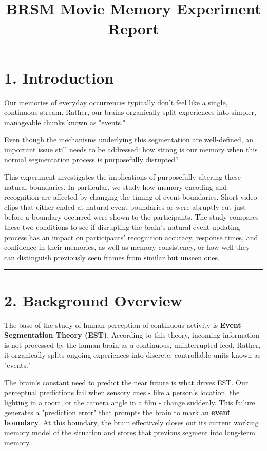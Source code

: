 \documentclass[10pt,a4paper]{article}
\title{\vspace{-2.5em}BRSM Movie Memory Experiment Report\vspace{-1em}}
\author{}
\date{}
\begin{document}
\maketitle
\vspace{-3em}

\section{1. Introduction}
Our memories of everyday occurrences typically don't feel like a single, continuous stream. Rather, our brains organically split experiences into simpler, manageable chunks known as "events."
 
Even though the mechanisms underlying this segmentation are well-defined, an important issue still needs to be addressed: how strong is our memory when this normal segmentation process is purposefully disrupted?

This experiment investigates the implications of purposefully altering these natural boundaries. In particular, we study how memory encoding and recognition are affected by changing the timing of event boundaries. Short video clips that either ended at natural event boundaries or were abruptly cut just before a boundary occurred were shown to the participants. The study compares these two conditions to see if disrupting the brain's natural event-updating process has an impact on participants' recognition accuracy, response times, and confidence in their memories, as well as memory consistency, or how well they can distinguish previously seen frames from similar but unseen ones.

\rule{\linewidth}{0.4pt}

\section{2. Background Overview}
The base of the study of human perception of continuous activity is \textbf{Event Segmentation Theory (EST)}. According to this theory, incoming information is not processed by the human brain as a continuous, uninterrupted feed. Rather, it organically splits ongoing experiences into discrete, controllable units known as "events." 

The brain's constant need to predict the near future is what drives EST. Our perceptual predictions fail when sensory cues - like a person's location, the lighting in a room, or the camera angle in a film - change suddenly. This failure generates a "prediction error" that prompts the brain to mark an \textbf{event boundary}. At this boundary, the brain effectively closes out its current working memory model of the situation and stores that previous segment into long-term memory. 
\end{document}
